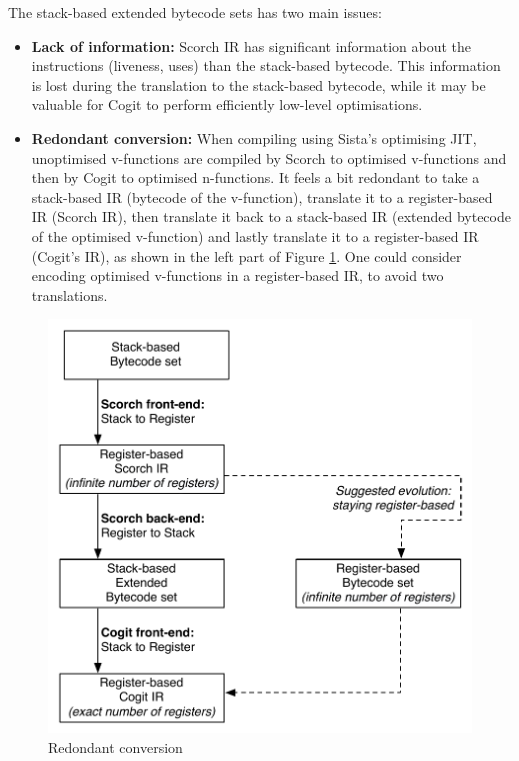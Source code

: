 \documentclass[a4paper,12pt,twoside]{../includes/ThesisStyle}
\begin{document}
The stack-based extended bytecode sets has two main issues:
\begin{itemize}
	\item \textbf{Lack of information:} Scorch IR has significant information about the instructions (liveness, uses) than the stack-based bytecode. This information is lost during the translation to the stack-based bytecode, while it may be valuable for Cogit to perform efficiently low-level optimisations.
	\item \textbf{Redondant conversion:} When compiling using Sista's optimising JIT, unoptimised v-functions are compiled by Scorch to optimised v-functions and then by Cogit to optimised n-functions. It feels a bit redondant to take a stack-based IR (bytecode of the v-function), translate it to a register-based IR (Scorch IR), then translate it back to a stack-based IR (extended bytecode of the optimised v-function) and lastly translate it to a register-based IR (Cogit's IR), as shown in the left part of Figure \ref{fig:FutureWorkRedondant}. One could consider encoding optimised v-functions in a register-based IR, to avoid two translations.
\end{itemize}

\begin{figure}[h!]
    \begin{center}
        \includegraphics[width=0.7\linewidth]{FutureWorkRedondant}
        \caption{Redondant conversion}
        \label{fig:FutureWorkRedondant}
    \end{center}
\end{figure}
\end{document}
